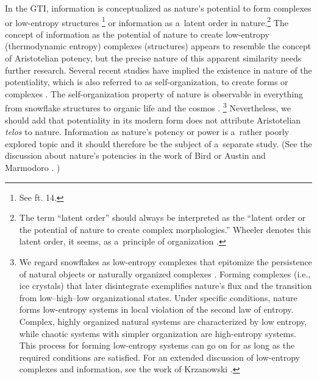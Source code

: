 In the GTI, information is conceptualized as nature's potential to form complexes or low-entropy structures 
\parencite[see][]{krzanowski_inquiry_2023}%
\footnote{See ft. 14.} or information as a~latent order in nature.\footnote{The term ``latent order'' should always be interpreted as the ``latent order or the potential of nature to create complex morphologies.'' Wheeler denotes this latent order, it seems, as a~principle of organization 
\parencite[][]{wheeler_information_1989}.%
} The concept of information as the potential of nature to create low-entropy (thermodynamic entropy) complexes (structures) appears to resemble the concept of Aristotelian potency, but the precise nature of this apparent similarity needs further research. Several recent studies have implied the existence in nature of the potentiality, which is also referred to as self-organization, to create forms or complexes 
\parencite[e.g][]{eigen_laws_1993}. %
 The self-organization property of nature is observable in everything from snowflake structures to organic life and the cosmos 
\parencites[e.g][]{reeves_heure_1986}[][]{schrodinger_what_2012}.%
\footnote{We regard snowflakes as low-entropy complexes that epitomize the persistence of natural objects or naturally organized complexes 
\parencite[][]{reeves_heure_1986}. %
 Forming complexes (i.e., ice crystals) that later disintegrate exemplifies nature's flux and the transition from low–high–low organizational states. Under specific conditions, nature forms low-entropy systems in local violation of the second law of entropy. Complex, highly organized natural systems are characterized by low entropy, while chaotic systems with simpler organization are high-entropy systems. This process for forming low-entropy systems can go on for as long as the required conditions are satisfied. For an extended discussion of low-entropy complexes and information, see the work of Krzanowski 
\parencite*[][]{krzanowski_inquiry_2023}.%
} Nevertheless, we should add that potentiality in its modern form does not attribute Aristotelian \textit{telos} to nature. Information as nature's potency or power is a~rather poorly explored topic and it should therefore be the subject of a~separate study. (See the discussion about nature's potencies in the work of Bird 
\parencite*[][]{bird_natures_2007} %
 or Austin and Marmodoro 
\parencite*[][]{}.%
)



